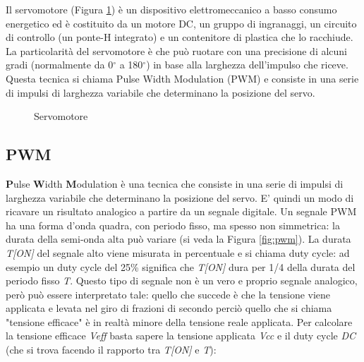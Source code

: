 \documentclass[12pt]{report}
\begin{document}
Il servomotore (Figura \ref{fig:servo}) è un dispositivo elettromeccanico a basso consumo energetico ed è costituito da un motore DC, un gruppo di ingranaggi, un circuito di controllo (un ponte-H integrato) e un contenitore di plastica che lo racchiude.
La particolarità del servomotore è che può ruotare con una precisione di alcuni gradi (normalmente da 0$^{\circ}$ a 180$^{\circ}$) in base alla larghezza dell'impulso che riceve. Questa tecnica si chiama Pulse Width Modulation (PWM) e consiste in una serie di impulsi di larghezza variabile che determinano la posizione del servo.


\begin{figure}
	\caption{Servomotore}
	\label{fig:servo}
\end{figure}

%
\subsection{PWM}
%

\textbf{P}ulse \textbf{W}idth \textbf{M}odulation è una tecnica che consiste in una serie di impulsi di larghezza variabile che determinano la posizione del servo. E' quindi un modo di ricavare un risultato analogico a partire da un segnale digitale. Un segnale PWM ha una forma d'onda quadra, con periodo fisso, ma spesso non simmetrica: la durata della semi-onda alta può variare (si veda la Figura \ref{fig:pwm}). La durata \textit{T[ON]} del segnale alto viene misurata in percentuale e si chiama duty cycle: ad esempio un duty cycle del 25\% significa che \textit{T[ON]} dura per 1/4 della durata del periodo fisso \textit{T}. Questo tipo di segnale non è un vero e proprio segnale analogico, però può essere interpretato tale: quello che succede è che la tensione viene applicata e levata nel giro di frazioni di secondo perciò quello che si chiama "tensione efficace" è in realtà minore della tensione reale applicata. Per calcolare la tensione efficace \textit{Veff} basta sapere la tensione applicata \textit{Vcc} e il duty cycle \textit{DC} (che si trova facendo il rapporto tra \textit{T[ON]} e \textit{T}):
\end{document}
